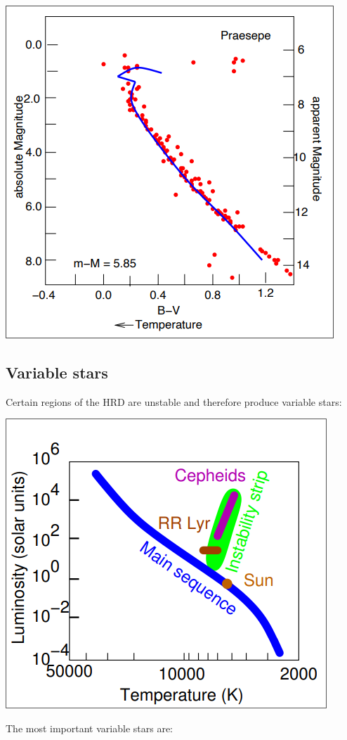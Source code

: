 \documentclass[11pt,a4paper]{article}
\begin{document}
\begin{center}
    \includegraphics[width=0.5\linewidth]{screenshot_2024-01-23-112801.png}
\end{center}
\subsection{Variable stars}
Certain regions of the HRD are unstable and therefore produce variable stars:
\begin{center}
    \includegraphics[width=0.5\linewidth]{screenshot_2024-01-23-113048.png}
\end{center}
The most important variable stars are: 
\end{document}
